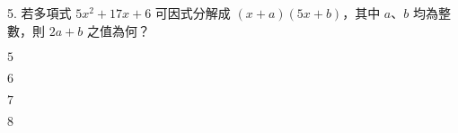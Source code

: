 \documentclass[12pt]{article}
\begin{document}
\begin{problem}
  \item[5.] 若多項式 $5x^2 + 17x + 6$ 可因式分解成 $(x + a)(5x + b)$，其中 $a$、$b$ 均為整數，則 $2a + b$ 之值為何？
  \begin{choices}
    \item $5$
    \item $6$
    \item $7$
    \item $8$
  \end{choices}
\end{problem}
\end{document}
